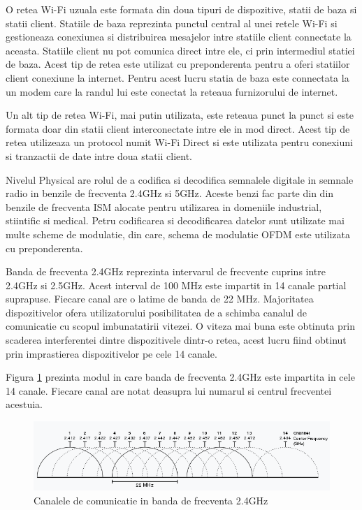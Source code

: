 O retea Wi-Fi uzuala este formata din doua tipuri de dispozitive, statii de baza si statii client. Statiile de baza reprezinta punctul central al unei retele Wi-Fi 
si gestioneaza conexiunea si distribuirea mesajelor intre statiile client connectate la aceasta. Statiile client nu pot comunica direct intre ele, ci prin 
intermediul statiei de baza. Acest tip de retea este utilizat cu preponderenta pentru a oferi statiilor client conexiune la internet. Pentru acest lucru 
statia de baza este connectata la un modem care la randul lui este conectat la reteaua furnizorului de internet.

Un alt tip de retea Wi-Fi, mai putin utilizata, este reteaua punct la punct si este formata doar din statii client interconectate intre ele in mod direct. 
Acest tip de retea utilizeaza un protocol numit Wi-Fi Direct si este utilizata pentru conexiuni si tranzactii de date intre doua statii client.

Nivelul Physical are rolul de a codifica si decodifica semnalele digitale in semnale radio in benzile de frecventa 2.4GHz si 5GHz. Aceste benzi fac parte din 
din benzile de frecventa ISM alocate pentru utilizarea in domeniile industrial, stiintific si medical. Petru codificarea si decodificarea datelor 
sunt utilizate mai multe scheme de modulatie, din care, schema de modulatie OFDM este utilizata cu preponderenta. 

Banda de frecventa 2.4GHz reprezinta intervarul de frecvente cuprins intre 2.4GHz si 2.5GHz. Acest interval de 100 MHz este impartit in 14 canale partial 
suprapuse. Fiecare canal are o latime de banda de 22 MHz. Majoritatea dispozitivelor ofera utilizatorului posibilitatea de a schimba canalul de comunicatie 
cu scopul imbunatatirii vitezei. O viteza mai buna este obtinuta prin scaderea interferentei dintre dispozitivele dintr-o retea, acest lucru fiind obtinut 
prin imprastierea dispozitivelor pe cele 14 canale. 

Figura \ref{fig:2400MHz_channels} prezinta modul in care banda de frecventa 2.4GHz este impartita in cele 14 canale. Fiecare canal are notat deasupra lui 
numarul si centrul frecventei acestuia.
\begin{figure}[H]
    \centering
    \includegraphics[scale=0.8]{figs/2400MHz_channels.png}
    \caption{Canalele de comunicatie in banda de frecventa 2.4GHz \cite{wifichannels}}
    \label{fig:2400MHz_channels}
\end{figure}

